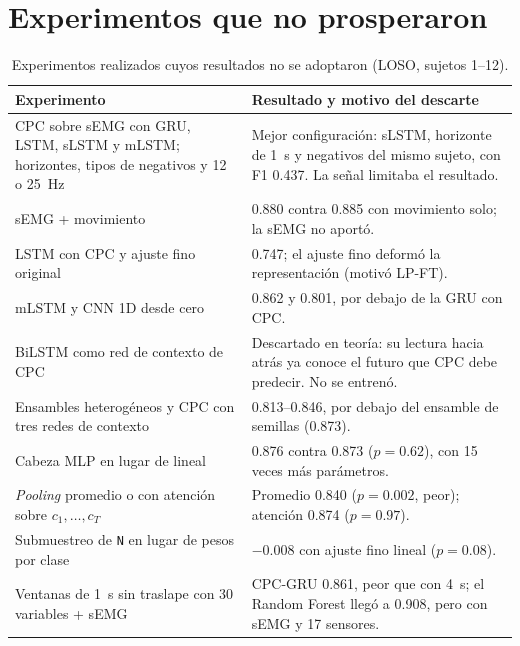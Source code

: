 \documentclass[letterpaper,11pt]{article}
\newcommand{\act}[1]{\texttt{#1}}
\begin{document}
\section{Experimentos que no prosperaron}
\label{anx:descartes}
\begin{table}[H]
  \centering
  \small
  \caption{Experimentos realizados cuyos resultados no se adoptaron (LOSO, sujetos 1--12).}
  \begin{tabular}{p{5.2cm}p{9.3cm}}
    \toprule
    Experimento & Resultado y motivo del descarte \\
    \midrule
    CPC sobre sEMG con GRU, LSTM, sLSTM y mLSTM; horizontes, tipos de negativos y 12 o 25~Hz & Mejor configuración: sLSTM, horizonte de 1~s y negativos del mismo sujeto, con F1 0.437. La señal limitaba el resultado. \\
    sEMG + movimiento & 0.880 contra 0.885 con movimiento solo; la sEMG no aportó. \\
    LSTM con CPC y ajuste fino original & 0.747; el ajuste fino deformó la representación (motivó LP-FT). \\
    mLSTM y CNN 1D desde cero & 0.862 y 0.801, por debajo de la GRU con CPC. \\
    BiLSTM como red de contexto de CPC & Descartado en teoría: su lectura hacia atrás ya conoce el futuro que CPC debe predecir. No se entrenó. \\
    Ensambles heterogéneos y CPC con tres redes de contexto & 0.813--0.846, por debajo del ensamble de semillas (0.873). \\
    Cabeza MLP en lugar de lineal & 0.876 contra 0.873 ($p = 0.62$), con 15 veces más parámetros. \\
    \emph{Pooling} promedio o con atención sobre $c_1,\dots,c_T$ & Promedio 0.840 ($p = 0.002$, peor); atención 0.874 ($p = 0.97$). \\
    Submuestreo de \act{N} en lugar de pesos por clase & $-0.008$ con ajuste fino lineal ($p = 0.08$). \\
    Ventanas de 1~s sin traslape con 30 variables + sEMG & CPC-GRU 0.861, peor que con 4~s; el Random Forest llegó a 0.908, pero con sEMG y 17 sensores. \\
    \bottomrule
  \end{tabular}
\end{table}
\end{document}
